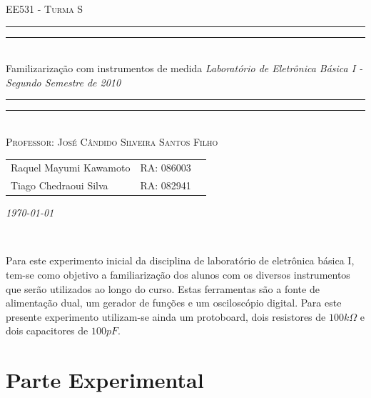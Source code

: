 \documentclass[a4paper]{article} %
\newcommand*{\titleTMB}{\begingroup \centering \settowidth{\unitlength}{\LARGE EE531} {\large\scshape EE531 - Turma S}\\[0.2\baselineskip] \rule{11.0cm}{1.6pt}\vspace*{-\baselineskip}\vspace*{2pt} \rule{11.0cm}{0.4pt}\\[\baselineskip] {\LARGE  Familizarização com instrumentos de medida}\vspace*{\baselineskip}  {\itshape Laboratório de Eletrônica Básica I - Segundo Semestre de 2010}\\ \rule{11.0cm}{0.4pt}\vspace*{-\baselineskip}\vspace{3.2pt} \rule{11.0cm}{1.6pt}\\[\baselineskip] {\large\scshape Professor: José Cândido Silveira Santos Filho}\par \vfill {\normalsize   \scshape 
    \begin{center} 
      \begin{tabular}{  l  l  p{5cm} } 
        Raquel Mayumi Kawamoto & RA: 086003\\
        Tiago Chedraoui Silva  & RA: 082941\\
      \end{tabular} \end{center}
    \itshape \today }\\[\baselineskip] \vspace{3.2pt} \endgroup}
\begin{document}
\titleTMB 
\newpage



Para este experimento inicial da disciplina de laboratório de eletrônica básica I, tem-se como objetivo a familiarização dos alunos com os diversos instrumentos que serão utilizados ao longo do curso. Estas ferramentas são a fonte de alimentação dual, um gerador de funções e um osciloscópio digital. Para este presente experimento utilizam-se ainda um protoboard, dois resistores de 
$100k\Omega$ e dois capacitores de $100pF$. 
	

\section*{Parte Experimental}
\end{document}
